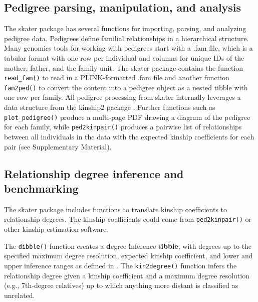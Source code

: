 \documentclass{bioinfo}
\begin{document}
\subsection{Pedigree parsing, manipulation, and analysis}

The skater package has several functions for importing, parsing, and
analyzing pedigree data. Pedigrees define familial relationships in a
hierarchical structure. Many genomics tools for working with pedigrees
start with a .fam file, which is a tabular format with one row per
individual and columns for unique IDs of the mother, father, and the
family unit. The skater package contains the function
\texttt{read\_fam()} to read in a PLINK-formatted .fam file and another
function \texttt{fam2ped()} to convert the content into a pedigree
object as a nested tibble with one row per family. All pedigree
processing from skater internally leverages a data structure from the
kinship2 package \citep{kinship2}. Further functions such as
\texttt{plot\_pedigree()} produce a multi-page PDF drawing a diagram of
the pedigree for each family, while \texttt{ped2kinpair()} produces a
pairwise list of relationships between all individuals in the data with
the expected kinship coefficients for each pair (see Supplementary
Material).

\subsection{Relationship degree inference and benchmarking}

The skater package includes functions to translate kinship coefficients
to relationship degrees. The kinship coefficients could come from
\texttt{ped2kinpair()} or other kinship estimation software.

The \texttt{dibble()} function creates a \textbf{d}egree
\textbf{i}nference t\textbf{ibble}, with degrees up to the specified
maximum degree resolution, expected kinship coefficient, and lower and
upper inference ranges as defined in \citet{manichaikul2010}. The
\texttt{kin2degree()} function infers the relationship degree given a
kinship coefficient and a maximum degree resolution (e.g., 7th-degree
relatives) up to which anything more distant is classified as unrelated.
\end{document}
